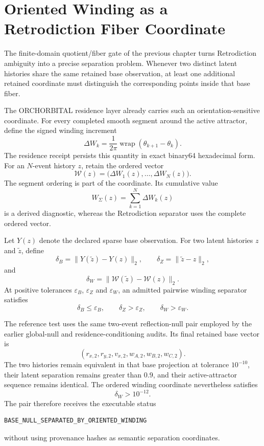 \documentclass[11pt]{book}
\begin{document}
\chapter{Oriented Winding as a Retrodiction Fiber Coordinate}
\label{chap:oriented-winding-fiber}

The finite-domain quotient/fiber gate of the previous chapter turns Retrodiction ambiguity into a precise separation problem.  Whenever two distinct latent histories share the same retained base observation, at least one additional retained coordinate must distinguish the corresponding points inside that base fiber.

The ORCHORBITAL residence layer already carries such an orientation-sensitive coordinate.  For every completed smooth segment around the active attractor, define the signed winding increment
\[
\Delta W_k
=\frac{1}{2\pi}\operatorname{wrap}(\theta_{k+1}-\theta_k).
\]
The residence receipt persists this quantity in exact binary64 hexadecimal form.  For an $N$-event history $z$, retain the ordered vector
\[
\boxed{
\mathcal W(z)
=\bigl(\Delta W_1(z),\ldots,\Delta W_N(z)\bigr).
}
\]
The segment ordering is part of the coordinate.  Its cumulative value
\[
W_{\Sigma}(z)=\sum_{k=1}^{N}\Delta W_k(z)
\]
is a derived diagnostic, whereas the Retrodiction separator uses the complete ordered vector.

Let $Y(z)$ denote the declared sparse base observation.  For two latent histories $z$ and $\widetilde z$, define
\[
\delta_B=\|Y(\widetilde z)-Y(z)\|_2,
\qquad
\delta_Z=\|\widetilde z-z\|_2,
\]
and
\[
\boxed{
\delta_W
=\|\mathcal W(\widetilde z)-\mathcal W(z)\|_2.
}
\]
At positive tolerances $\varepsilon_B$, $\varepsilon_Z$ and $\varepsilon_W$, an admitted pairwise winding separator satisfies
\[
\delta_B\le\varepsilon_B,
\qquad
\delta_Z>\varepsilon_Z,
\qquad
\delta_W>\varepsilon_W.
\]

The reference test uses the same two-event reflection-null pair employed by the earlier global-null and residence-conditioning audits.  Its final retained base vector is
\[
(r_{x,2},r_{y,2},v_{x,2},w_{A,2},w_{B,2},w_{C,2}).
\]
The two histories remain equivalent in that base projection at tolerance $10^{-10}$, their latent separation remains greater than $0.9$, and their active-attractor sequence remains identical.  The ordered winding coordinate nevertheless satisfies
\[
\boxed{
\delta_W>10^{-12}.
}
\]
The pair therefore receives the executable status
\begin{verbatim}
BASE_NULL_SEPARATED_BY_ORIENTED_WINDING
\end{verbatim}
without using provenance hashes as semantic separation coordinates.
\end{document}
